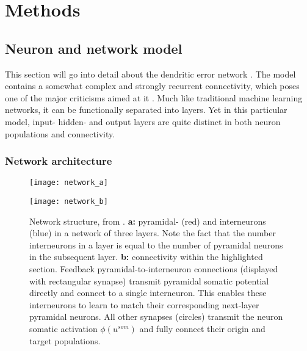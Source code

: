 \chapter{Methods}

\section{Neuron and network model}

This section will go into detail about the dendritic error network \citep{sacramento2018dendritic}. The model contains a
somewhat complex and strongly recurrent connectivity, which poses one of the major criticisms aimed at it
\citep{whittington2019theories}. Much like traditional machine learning networks, it can be functionally separated into
layers. Yet in this particular model, input- hidden- and output layers are quite distinct in both neuron populations and
connectivity.


\subsection{Network architecture}

\begin{figure}[t]
  \centering
  \begin{minipage}{0.5\textwidth}
    \centering
    \texttt{[image: network\_a]}
  \end{minipage}\hfill
  \begin{minipage}{0.4\textwidth}
    \centering
    \texttt{[image: network\_b]}
  \end{minipage}
  \caption{Network structure, from \cite{Haider2021}. \textbf{a:} pyramidal- (red) and interneurons (blue) in a network
    of three layers. Note the fact that the number interneurons in a layer is equal to the number of pyramidal neurons
    in the subsequent layer\protect\footnotemark. \textbf{b:} connectivity within the highlighted section. Feedback
    pyramidal-to-interneuron connections (displayed with rectangular synapse) transmit pyramidal somatic potential
    directly and connect to a single interneuron. This enables these interneurons to learn to match their corresponding
    next-layer pyramidal neurons. All other synapses (circles) transmit the neuron somatic activation $\phi (u^{som})$
    and fully connect their origin and target populations.}
  \label{fig-network}
\end{figure}


